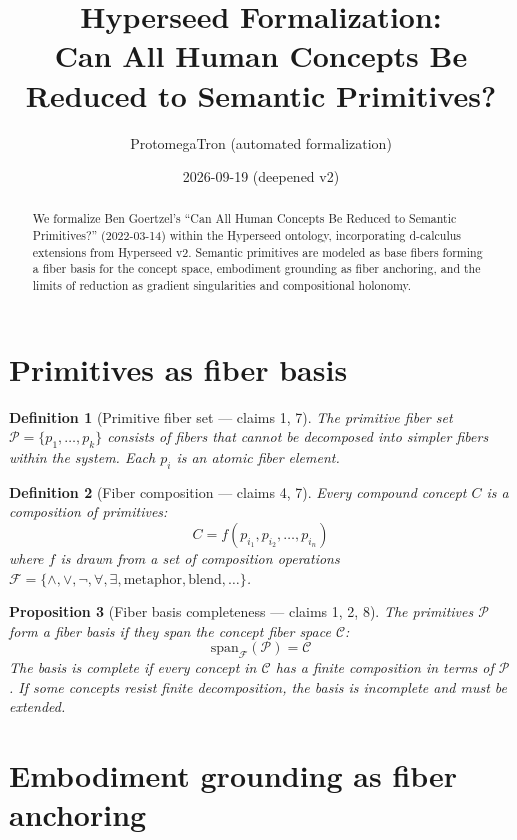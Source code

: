\documentclass[11pt,a4paper]{article}
\title{Hyperseed Formalization:\\
  Can All Human Concepts Be Reduced to Semantic Primitives?}
\author{ProtomegaTron (automated formalization)}
\date{2026-09-19 (deepened v2)}
\newtheorem{definition}{Definition}[section]
\newtheorem{proposition}[definition]{Proposition}
\begin{document}
\maketitle

\begin{abstract}
We formalize Ben Goertzel's ``Can All Human Concepts Be Reduced to
Semantic Primitives?'' (2022-03-14) within the Hyperseed ontology,
incorporating d-calculus extensions from Hyperseed v2. Semantic primitives
are modeled as base fibers forming a fiber basis for the concept space,
embodiment grounding as fiber anchoring, and the limits of reduction as
gradient singularities and compositional holonomy.
\end{abstract}

\tableofcontents

\section{Primitives as fiber basis}

\begin{definition}[Primitive fiber set --- claims 1, 7]
The \emph{primitive fiber set} $\mathcal{P} = \{p_1, \ldots, p_k\}$
consists of fibers that cannot be decomposed into simpler fibers within
the system. Each $p_i$ is an atomic fiber element.
\end{definition}

\begin{definition}[Fiber composition --- claims 4, 7]
Every compound concept $C$ is a composition of primitives:
\[
  C = f(p_{i_1}, p_{i_2}, \ldots, p_{i_n})
\]
where $f$ is drawn from a set of composition operations
$\mathcal{F} = \{\wedge, \vee, \neg, \forall, \exists, \text{metaphor},
\text{blend}, \ldots\}$.
\end{definition}

\begin{proposition}[Fiber basis completeness --- claims 1, 2, 8]
\label{prop:basis}
The primitives $\mathcal{P}$ form a fiber basis if they span the
concept fiber space $\mathcal{C}$:
\[
  \text{span}_\mathcal{F}(\mathcal{P}) = \mathcal{C}
\]
The basis is \emph{complete} if every concept in $\mathcal{C}$ has a
finite composition in terms of $\mathcal{P}$. If some concepts resist
finite decomposition, the basis is incomplete and must be extended.
\end{proposition}

\section{Embodiment grounding as fiber anchoring}
\end{document}
